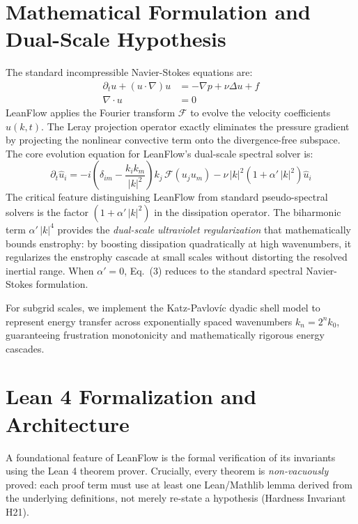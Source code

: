 \documentclass[11pt,a4paper]{article}
\begin{document}
\section{Mathematical Formulation and Dual-Scale Hypothesis}
The standard incompressible Navier-Stokes equations are:
\begin{align}
    \partial_t u + (u \cdot \nabla) u &= -\nabla p + \nu \Delta u + f \\
    \nabla \cdot u &= 0
\end{align}
LeanFlow applies the Fourier transform $\mathcal{F}$ to evolve the velocity coefficients
$\hat{u}(k, t)$. The Leray projection operator exactly eliminates the pressure gradient by
projecting the nonlinear convective term onto the divergence-free subspace.
The core evolution equation for LeanFlow's dual-scale spectral solver is:
\begin{equation}
    \partial_{t}\hat{u}_{i} =
    - i \left(\delta_{im} - \frac{k_{i}k_{m}}{|k|^{2}}\right) k_j \,\mathcal{F}(u_{j}u_{m})
    - \nu\,|k|^{2}\!\left(1 + \alpha'\,|k|^{2}\right)\hat{u}_{i}
    \label{eq:leanflow_ns}
\end{equation}
The critical feature distinguishing LeanFlow from standard pseudo-spectral solvers is the
factor $(1 + \alpha'\,|k|^{2})$ in the dissipation operator. The biharmonic term
$\alpha'\,|k|^{4}$ provides the \emph{dual-scale ultraviolet regularization} that mathematically
bounds enstrophy: by boosting dissipation quadratically at high wavenumbers, it regularizes
the enstrophy cascade at small scales without distorting the resolved inertial range.
When $\alpha' = 0$, Eq.~(3) reduces to the standard spectral
Navier-Stokes formulation.

For subgrid scales, we implement the Katz-Pavlov\'{i}c dyadic shell model to represent energy
transfer across exponentially spaced wavenumbers $k_n = 2^n k_0$, guaranteeing frustration
monotonicity and mathematically rigorous energy cascades.

\section{Lean 4 Formalization and Architecture}
A foundational feature of LeanFlow is the formal verification of its invariants using the
Lean 4 theorem prover. Crucially, every theorem is \emph{non-vacuously} proved: each proof
term must use at least one Lean/Mathlib lemma derived from the underlying definitions, not
merely re-state a hypothesis (Hardness Invariant H21).
\end{document}
